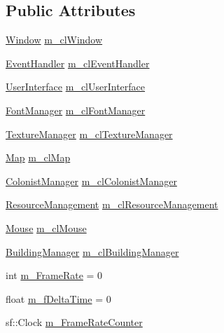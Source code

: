\subsection*{Public Attributes}
\begin{DoxyCompactItemize}
\item 
\mbox{\hyperlink{class_window}{Window}} \mbox{\hyperlink{class_gameloop_af9dba05c7f15135d2277c0641d1e3ed6}{m\+\_\+cl\+Window}}
\item 
\mbox{\hyperlink{class_event_handler}{Event\+Handler}} \mbox{\hyperlink{class_gameloop_a9c0e4ba2c76eb01dc9db00e38ec715f5}{m\+\_\+cl\+Event\+Handler}}
\item 
\mbox{\hyperlink{class_user_interface}{User\+Interface}} \mbox{\hyperlink{class_gameloop_abc125f36fd39f102f8fd445d6dcd2177}{m\+\_\+cl\+User\+Interface}}
\item 
\mbox{\hyperlink{class_font_manager}{Font\+Manager}} \mbox{\hyperlink{class_gameloop_a15154448022c37afed6b8e88ce3620df}{m\+\_\+cl\+Font\+Manager}}
\item 
\mbox{\hyperlink{class_texture_manager}{Texture\+Manager}} \mbox{\hyperlink{class_gameloop_a49235a9234f27b5555a979f088977659}{m\+\_\+cl\+Texture\+Manager}}
\item 
\mbox{\hyperlink{class_map}{Map}} \mbox{\hyperlink{class_gameloop_a45f56c3ccf5d7f2954fd0b12548605ed}{m\+\_\+cl\+Map}}
\item 
\mbox{\hyperlink{class_colonist_manager}{Colonist\+Manager}} \mbox{\hyperlink{class_gameloop_a62b8cd74b5504ccb88dbb48459ad0ffb}{m\+\_\+cl\+Colonist\+Manager}}
\item 
\mbox{\hyperlink{class_resource_management}{Resource\+Management}} \mbox{\hyperlink{class_gameloop_a19b6f5646a18db624cad3bbf62884473}{m\+\_\+cl\+Resource\+Management}}
\item 
\mbox{\hyperlink{class_mouse}{Mouse}} \mbox{\hyperlink{class_gameloop_ac63d068b8f158a2a41d14bd5f826bcc8}{m\+\_\+cl\+Mouse}}
\item 
\mbox{\hyperlink{class_building_manager}{Building\+Manager}} \mbox{\hyperlink{class_gameloop_a70679dd20e06d97dc834147be9df6c86}{m\+\_\+cl\+Building\+Manager}}
\item 
int \mbox{\hyperlink{class_gameloop_a6d770b1e4841ad3a8808f6ce886c2b41}{m\+\_\+\+Frame\+Rate}} = 0
\item 
float \mbox{\hyperlink{class_gameloop_aeac3893e086b10a9bbf455d3ed72745a}{m\+\_\+f\+Delta\+Time}} = 0
\item 
sf\+::\+Clock \mbox{\hyperlink{class_gameloop_a182c631047f14eea7648ea75f17237bf}{m\+\_\+\+Frame\+Rate\+Counter}}

\end{DoxyCompactItemize}
